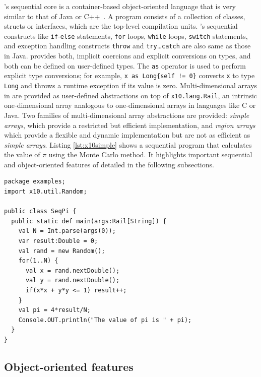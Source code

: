 \xten's sequential core is a container-based object-oriented language that is 
very similar to that of Java or C++~\cite{specs}. A \xten program consists of a
collection of classes, structs or interfaces, which are the top-level compilation
units.
\xten's sequential
constructs like \texttt{if}-\texttt{else} statements, \texttt{for} loops,
\texttt{while} loops, \texttt{switch} statements, and exception handling
constructs \texttt{throw} and \texttt{try}\ldots\texttt{catch} are also same 
as those in Java. 
\xten provides both, implicit coercions and explicit conversions on types, and 
both can
be defined on user-defined types. The \texttt{as} operator is used to perform
explicit type conversions; for example, \texttt{x as Long\{self != 0\}} converts
\texttt{x} to type \texttt{Long} and throws a runtime exception if its value is
zero. Multi-dimensional arrays in \xten are provided as user-defined abstractions on top of
\texttt{x10.lang.Rail}, an intrinsic one-dimensional array analogous to
one-dimensional arrays in languages like C or Java. Two families of
multi-dimensional array abstractions are provided: \emph{simple arrays}, which
provide
a restricted but efficient implementation, and \emph{region arrays} which
provide
a flexible and dynamic implementation but are not as efficient as \emph{simple
arrays}.
Listing \ref{lst:x10simple} shows a sequential 
\xten program that calculates the value of $\pi$
using the Monte Carlo method. It highlights important sequential and
object-oriented features of \xten detailed in the following subsections.

\begin{lstlisting}[caption={Sequential \xten program to calculate value of $\pi$
using Monte Carlo method},label={lst:x10simple},language=x10,numbers=none]
package examples;
import x10.util.Random;

public class SeqPi {
  public static def main(args:Rail[String]) {
    val N = Int.parse(args(0));
    var result:Double = 0;
    val rand = new Random();
    for(1..N) {
      val x = rand.nextDouble();
      val y = rand.nextDouble();
      if(x*x + y*y <= 1) result++;
    }
    val pi = 4*result/N;
    Console.OUT.println("The value of pi is " + pi);
  }
}

\end{lstlisting}

\subsection{Object-oriented features}

